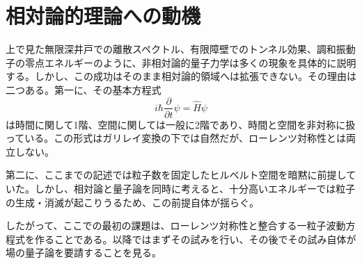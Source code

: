 \section{相対論的理論への動機}
上で見た無限深井戸での離散スペクトル、有限障壁でのトンネル効果、調和振動子の零点エネルギーのように、非相対論的量子力学は多くの現象を具体的に説明する。しかし、この成功はそのまま相対論的領域へは拡張できない。その理由は二つある。第一に、その基本方程式
\[
i\hbar \frac{\partial}{\partial t}\psi = \hat{H}\psi
\]
は時間に関して1階、空間に関しては一般に2階であり、時間と空間を非対称に扱っている。この形式はガリレイ変換の下では自然だが、ローレンツ対称性とは両立しない。

第二に、ここまでの記述では粒子数を固定したヒルベルト空間を暗黙に前提していた。しかし、相対論と量子論を同時に考えると、十分高いエネルギーでは粒子の生成・消滅が起こりうるため、この前提自体が揺らぐ。

したがって、ここでの最初の課題は、ローレンツ対称性と整合する一粒子波動方程式を作ることである。以降ではまずその試みを行い、その後でその試み自体が場の量子論を要請することを見る。
